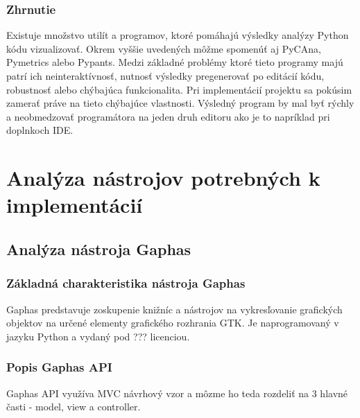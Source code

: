 \documentclass[11pt,oneside,final]{fithesis2}
\begin{document}
	\subsection{Zhrnutie}
	
	Existuje množstvo utilít a programov, ktoré pomáhajú výsledky analýzy Python kódu vizualizovať. Okrem vyššie uvedených môžme spomenúť aj PyCAna, Pymetrics alebo Pypants. Medzi základné problémy ktoré tieto programy majú patrí ich neinteraktívnosť, nutnosť výsledky pregenerovať po editácií kódu, robustnosť alebo chýbajúca funkcionalita. Pri implementácií projektu sa pokúsim zamerať práve na tieto chýbajúce vlastnosti. Výsledný program by mal byť rýchly a neobmedzovať programátora na jeden druh editoru ako je to napríklad pri doplnkoch IDE.
	
    
\chapter{Analýza nástrojov potrebných k implementácií}

	\section{Analýza nástroja Gaphas}

	\subsection{Základná charakteristika nástroja Gaphas}

		Gaphas predstavuje zoskupenie knižníc a nástrojov na vykresľovanie grafických objektov na určené elementy grafického rozhrania GTK. Je naprogramovaný v jazyku Python a vydaný pod ??? licenciou.

	\subsection{Popis Gaphas API}

Gaphas API využíva MVC návrhový vzor a môzme ho teda rozdeliť na 3 hlavné časti - model, view a controller.
\end{document}
